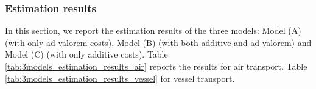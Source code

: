 \documentclass[11pt,twoside, authoryear]{elsarticle}
\begin{document}
\subsubsection{Estimation results}

In this section, we report the estimation results of the three models: Model (A) (with only ad-valorem costs), Model (B) (with both additive and ad-valorem) and Model (C) (with only additive costs). Table \ref{tab:3models_estimation_results_air} reports the results for air transport, Table \ref{tab:3models_estimation_results_vessel} for vessel transport.

\setcounter{table}{0}
\renewcommand{\thetable}{A.\arabic{table}}
\end{document}
